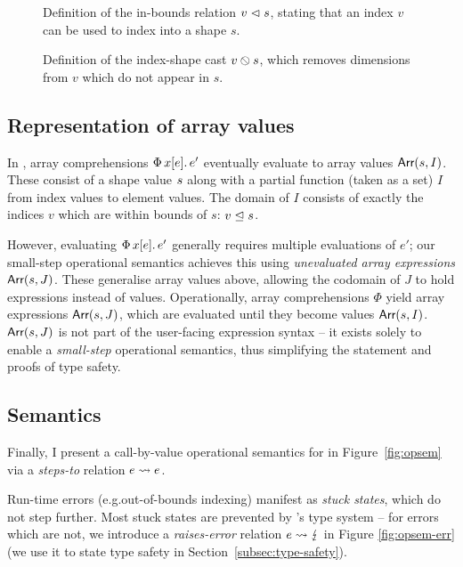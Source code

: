 \begin{figure}
    \centering
    
    \caption{Definition of the in-bounds relation $v \vartriangleleft s$, stating that an index $v$ can be used to index into a shape $s$.}
    \label{fig:in-bounds}
\end{figure}

\begin{figure}
    \centering
    
    \caption{Definition of the index-shape cast ${v} \obslash {s}$, which removes dimensions from $v$ which do not appear in $s$.}
    \label{fig:cast}
\end{figure}

\subsection{Representation of array values}
\label{subsec:array-values}

In \starr{}, array comprehensions $\sbuild{x}{e}{e'}$ eventually evaluate to array values $\textsf{Arr}(s,I)$.
These consist of a shape value $s$ along with a partial function (taken as a set) $I$ from index values to element values.
The domain of $I$ consists of exactly the indices $v$ which are within bounds of $s$: $v \trianglelefteq s$.

However, evaluating  $\sbuild{x}{e}{e'}$ generally requires multiple evaluations of $e'$; our small-step operational semantics achieves this using \emph{unevaluated array expressions} $\textsf{Arr}(s,J)$.
These generalise array values above, allowing the codomain of $J$ to hold expressions instead of values.
Operationally, array comprehensions $\Phi$ yield array expressions $\textsf{Arr}(s,J)$, which are evaluated until they become values $\textsf{Arr}(s,I)$.
$\textsf{Arr}(s,J)$ is not part of the user-facing expression syntax -- it exists solely to enable a \emph{small-step} operational semantics, thus simplifying the statement and proofs of type safety.

\subsection{Semantics}
\label{subsec:semantics}

Finally, I present a call-by-value operational semantics for \starr{} in Figure~\ref{fig:opsem} via a \emph{steps-to} relation $e \leadsto e$.

Run-time errors (e.g.\@ out-of-bounds indexing)
manifest as \emph{stuck states}, which do not step further. Most stuck states are prevented by \starr{}'s type system -- for errors which are not, we introduce a \emph{raises-error} relation $e \leadsto \lightning$ in Figure \ref{fig:opsem-err} (we use it to state type safety in Section~\ref{subsec:type-safety}).

